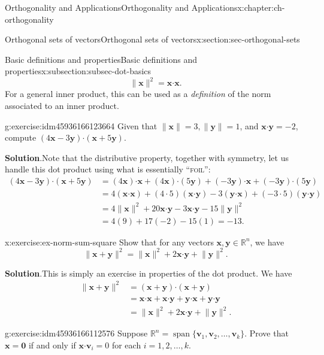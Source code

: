 \documentclass[oneside,10pt,]{book}
\newcommand{\blocktitlefont}{\relax}
\newcommand{\initialism}[1]{\textsc{\MakeLowercase{#1}}}
\numberwithin{equation}{section}
\newcommand{\spn}{\operatorname{span}}
\newcommand{\R}{\mathbb{R}}
\newcommand{\dotp}{\!\boldsymbol{\cdot}\!}
\newcommand{\len}[1]{\lVert #1\rVert}
\newcommand{\vv}{\mathbf{v}}
\newcommand{\xx}{\mathbf{x}}
\newcommand{\yy}{\mathbf{y}}
\newcommand{\amp}{&}
\begin{document}
\begin{chapterptx}{Orthogonality and Applications}{}{Orthogonality and Applications}{}{}{x:chapter:ch-orthogonality}
\begin{sectionptx}{Orthogonal sets of vectors}{}{Orthogonal sets of vectors}{}{}{x:section:sec-orthogonal-sets}
\begin{subsectionptx}{Basic definitions and properties}{}{Basic definitions and properties}{}{}{x:subsection:subsec-dot-basics}
\begin{equation*}
\len{\xx}^2 = \xx\dotp \xx\text{.}
\end{equation*}
For a general inner product, this can be used as a \emph{definition} of the norm associated to an inner product.%
\begin{inlineexercise}{}{g:exercise:idm45936166123664}%
Given that \(\len{\xx}=3, \len{\yy}=1\), and \(\xx\dotp\yy=-2\), compute \((4\xx-3\yy)\dotp (\xx+5\yy)\).%
\par\smallskip%
\noindent\textbf{\blocktitlefont Solution}.\label{g:solution:idm45936166118960}{}\hypertarget{g:solution:idm45936166118960}{}\quad{}Note that the distributive property, together with symmetry, let us handle this dot product using what is essentially ``\initialism{FOIL}'':%
\begin{align*}
(4\xx-3\yy)\dotp (\xx+5\yy)\amp = (4\xx)\dotp \xx+(4\xx)\dotp(5\yy)+(-3\yy)\dotp \xx+(-3\yy)\dotp(5\yy)\\
\amp = 4(\xx\dotp\xx)+(4\cdot 5)(\xx\dotp \yy)-3(\yy\dotp \xx)+(-3\cdot 5)(\yy\dotp\yy)\\
\amp = 4\len{\xx}^2+20\xx\dotp\yy-3\xx\dotp\yy-15\len{\yy}^2\\
\amp = 4(9)+17(-2)-15(1) = -13\text{.}
\end{align*}
%
\end{inlineexercise}%
\begin{inlineexercise}{}{x:exercise:ex-norm-sum-square}%
Show that for any vectors \(\xx,\yy\in\R^n\), we have%
\begin{equation*}
\len{\xx+\yy}^2 = \len{\xx}^2+2\xx\dotp\yy+\len{\yy}^2\text{.}
\end{equation*}
%
\par\smallskip%
\noindent\textbf{\blocktitlefont Solution}.\label{g:solution:idm45936166114368}{}\hypertarget{g:solution:idm45936166114368}{}\quad{}This is simply an exercise in properties of the dot product. We have%
\begin{align*}
\len{\xx+\yy}^2 \amp = (\xx+\yy)\dotp (\xx+\yy) \\
\amp = \xx\dotp \xx+\xx\dotp\yy+\yy\dotp\xx+\yy\dotp\yy\\
\amp =\len{\xx}^2+2\xx\dotp\yy+\len{\yy}^2\text{.}
\end{align*}
%
\end{inlineexercise}%
\begin{inlineexercise}{}{g:exercise:idm45936166112576}%
Suppose \(\mathbb{R}^n=\spn\{\vv_1,\vv_2,\ldots, \vv_k\}\). Prove that \(\xx=\mathbf{0}\) if and only if \(\xx\dotp \vv_i=0\) for each \(i=1,2,\ldots, k\).%

\end{inlineexercise}
\end{subsectionptx}
\end{sectionptx}
\end{chapterptx}
\end{document}
